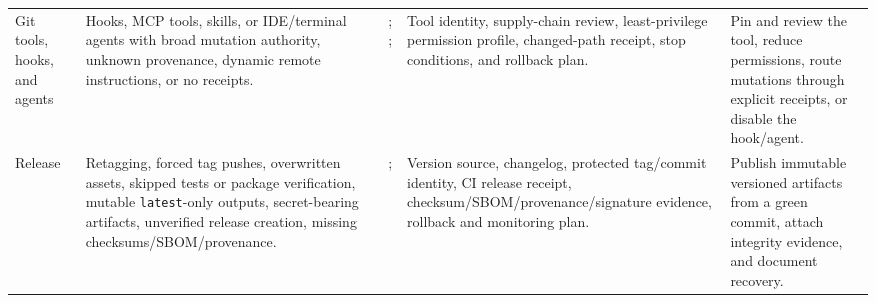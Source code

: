 \begin{longtable}{L{0.10\textwidth} L{0.20\textwidth} L{0.17\textwidth} L{0.22\textwidth} L{0.13\textwidth}}
Git tools, hooks, and agents & Hooks, MCP tools, skills, or IDE/terminal agents with broad mutation authority, unknown provenance, dynamic remote instructions, or no receipts. & ; ;  & Tool identity, supply-chain review, least-privilege permission profile, changed-path receipt, stop conditions, and rollback plan. & Pin and review the tool, reduce permissions, route mutations through explicit receipts, or disable the hook/agent. \\
Release & Retagging, forced tag pushes, overwritten assets, skipped tests or package verification, mutable \texttt{latest}-only outputs, secret-bearing artifacts, unverified release creation, missing checksums/SBOM/provenance. & ;  & Version source, changelog, protected tag/commit identity, CI release receipt, checksum/SBOM/provenance/signature evidence, rollback and monitoring plan. & Publish immutable versioned artifacts from a green commit, attach integrity evidence, and document recovery. \\
\bottomrule
\end{longtable}
\endgroup
